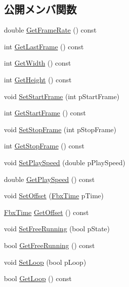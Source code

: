 \subsection*{公開メンバ関数}
\begin{DoxyCompactItemize}
\item 
double \hyperlink{class_fbx_video_afa17b30dbcff2e23fe507585e2688619}{Get\+Frame\+Rate} () const
\item 
int \hyperlink{class_fbx_video_abcc991da628ef1ae31f15a64d773e8be}{Get\+Last\+Frame} () const
\item 
int \hyperlink{class_fbx_video_a9ad08f6d0da0e76353dc6250f1321093}{Get\+Width} () const
\item 
int \hyperlink{class_fbx_video_a49e54923c0ec892e5bebf479545a32de}{Get\+Height} () const
\item 
void \hyperlink{class_fbx_video_a85a31f27e4cca068fd285385998bcad5}{Set\+Start\+Frame} (int p\+Start\+Frame)
\item 
int \hyperlink{class_fbx_video_ab634605d67edca645b11d575b04e42ff}{Get\+Start\+Frame} () const
\item 
void \hyperlink{class_fbx_video_aa7dd98bc975a79daf988c395be2199cd}{Set\+Stop\+Frame} (int p\+Stop\+Frame)
\item 
int \hyperlink{class_fbx_video_a8b6b7be05e339cfe47998674269242e7}{Get\+Stop\+Frame} () const
\item 
void \hyperlink{class_fbx_video_a9f7fd819e6d3eeea943183264c55d357}{Set\+Play\+Speed} (double p\+Play\+Speed)
\item 
double \hyperlink{class_fbx_video_a69311023497b0ace1ac4fd78318b178a}{Get\+Play\+Speed} () const
\item 
void \hyperlink{class_fbx_video_a8385942ed01c3258b7ebd7b3080962c2}{Set\+Offset} (\hyperlink{class_fbx_time}{Fbx\+Time} p\+Time)
\item 
\hyperlink{class_fbx_time}{Fbx\+Time} \hyperlink{class_fbx_video_ac4a2e039c73ba16c80f3c538a739a364}{Get\+Offset} () const
\item 
void \hyperlink{class_fbx_video_ade24bcc804d746751c5a35c1bde50333}{Set\+Free\+Running} (bool p\+State)
\item 
bool \hyperlink{class_fbx_video_a47eacfcc9760e1b014cc706795e267fd}{Get\+Free\+Running} () const
\item 
void \hyperlink{class_fbx_video_a8fbffbebcc3ef5f170003d0f18ecd7ee}{Set\+Loop} (bool p\+Loop)
\item 
bool \hyperlink{class_fbx_video_a6b78fbe7939fb49f51c1d381fe927816}{Get\+Loop} () const

\end{DoxyCompactItemize}

